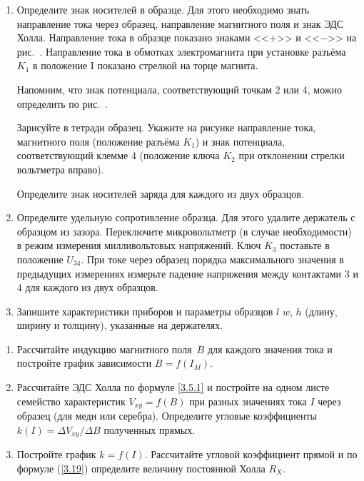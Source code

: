 \begin{lab:task}
\begin{enumerate}
{При максимальном токе через образец проведите измерения $U=f(I_{M})$ при другом направлении магнитного поля.

Для образца из цинка снимите зависимость $U=f(I_{M})$ при одном значении тока через образец.}

\item{Определите знак носителей в образце. Для этого необходимо знать направление тока через образец, направление магнитного поля и знак ЭДС Холла. Направление тока в образце показано знаками <<$+$>> и <<$-$>> на рис.~. Направление тока в обмотках электромагнита при установке разъёма $K_1$ в положение I показано стрелкой на торце магнита.

Напомним, что знак потенциала, соответствующий точкам 2 или 4, можно определить по рис.~.

Зарисуйте в тетради образец. Укажите на рисунке направление тока, магнитного поля (положение разъёма $K_1$) и знак
потенциала, соответствующий клемме 4 (положение ключа $K_2$ при отклонении стрелки вольтметра вправо).

Определите знак носителей заряда для каждого из двух образцов.}
\item{Определите удельную сопротивление образца. Для этого удалите держатель с образцом из зазора. Переключите микровольтметр (в случае необходимости) в режим измерения милливольтовых напряжений. Ключ $K_3$ поставьте в положение $U_{34}$. При токе через образец порядка максимального значения в предыдущих измерениях измерьте падение напряжения между контактами 3 и 4 для каждого из двух образцов.}

\item{ Запишите характеристики приборов и параметры образцов $l$ $w$, $h$ (длину, ширину и толщину), указанные на держателях.}
\end{enumerate}

\begin{enumerate}
\item{Рассчитайте индукцию магнитного поля~$B$ для каждого значения тока и постройте график зависимости $B=f(I_{M})$.}

\item{Рассчитайте ЭДС Холла по формуле \eqref{3.5.1} и постройте на одном листе семейство характеристик $V_{xy}=f(B)$ при разных значениях тока $I$ через образец (для меди или серебра). Определите угловые коэффициенты $k(I)=\Delta V_{xy}/\Delta B$ полученных прямых.}

\item{ Постройте график $k=f(I)$. Рассчитайте угловой коэффициент прямой и по формуле (\ref{3.19}) определите величину постоянной Холла $R_X$.

}
\end{enumerate}
\end{lab:task}
